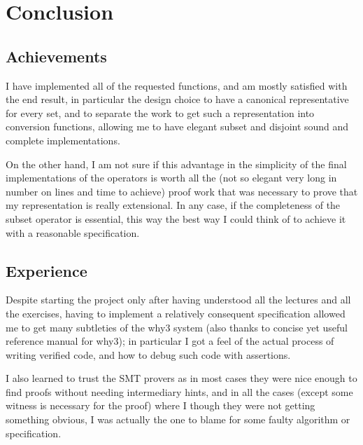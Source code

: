 \section{Conclusion}

\subsection{Achievements}
I have implemented all of the requested functions, and am mostly satisfied with the
end result, in particular the design choice to have a canonical representative for
every set, and to separate the work to get such a representation into conversion
functions, allowing me to have elegant subset and disjoint sound and complete
implementations.

On the other hand, I am not sure if this advantage in the simplicity of the final
implementations of the operators is worth all the (not so elegant very long in number
on lines and time to achieve) proof work that was necessary to prove that my
representation is really extensional.
%
In any case, if the completeness of the subset operator is essential, this way the
best way I could think of to achieve it with a reasonable specification.


\subsection{Experience}
Despite starting the project only after having understood all the lectures and all
the exercises, having to implement a relatively consequent specification allowed me
to get many subtleties of the why3 system (also thanks to concise yet useful
reference manual for why3); in particular I got a feel of the actual process of
writing verified code, and how to debug such code with assertions.

I also learned to trust the SMT provers as in most cases they were nice enough to
find proofs without needing intermediary hints, and in all the cases (except some
witness is necessary for the proof) where I though they were not getting something
obvious, I was actually the one to blame for some faulty algorithm or
specification.
